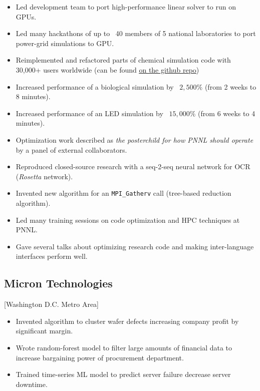 \documentclass{mycv}
\begin{document}
\begin{itemize}
  \item Led development team to port high-performance linear solver to run on GPUs.
  \item Led many hackathons of up to ~40 members of 5 national laboratories to port power-grid simulations to GPU.
  \item Reimplemented and refactored parts of chemical simulation code with 30,000+ users worldwide (can be found \href{https://github.com/Electrostatics/apbs}{\underline{on the github repo}})
  \item Increased performance of a biological simulation by ~$2,500\%$ (from 2 weeks to 8 minutes).
  \item Increased performance of an LED simulation by ~$15,000\%$ (from 6 weeks to 4 minutes).
  \item Optimization work described as \textit{the posterchild for how PNNL should operate} by a panel of external collaborators.
  \item Reproduced closed-source research with a seq-2-seq neural network for OCR (\textit{Rosetta} network).
  \item Invented new algorithm for an \verb!MPI_Gatherv! call (tree-based reduction algorithm).
  \item Led many training sessions on code optimization and HPC techniques at PNNL.
  \item Gave several talks about optimizing research code and making inter-language interfaces perform well.
\end{itemize}

\subsection{Micron Technologies}[Washington D.C. Metro Area]
\begin{positions}
\end{positions}

\begin{itemize}
  \item Invented algorithm to cluster wafer defects increasing company profit by significant margin.
  \item Wrote random-forest model to filter large amounts of financial data to increase bargaining power of procurement department.
  \item Trained time-series ML model to predict server failure decrease server downtime.
\end{itemize}
\end{document}

